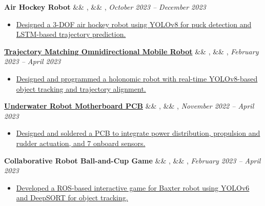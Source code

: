\documentclass[letterpaper,10pt]{article}
\newcommand{\experience}[5]{%
    \vspace{-1mm}%
    \noindent\textbf{#1}%
    \ifx&#2&
    \else
        , \textit{#2}%
    \fi
    \ifx&#3&
    \else
        , #3%
    \fi
    \hfill \textit{#4} \\
    \vspace{-6.8mm}%
    \begin{itemize}[itemsep=-5pt]
        \setlength{\itemindent}{0em}
        #5
    \end{itemize}
}
\begin{document}
\experience
    {Air Hockey Robot}
    {}
    {}
    {October 2023 – December 2023}
    {
        \item \href{https://ryanbarry.me/projects/robotics/air-hockey-robot/}{Designed a 3-DOF air hockey robot using YOLOv8 for puck detection and LSTM-based trajectory prediction.}
    }


    


    
\experience
    {\href{https://github.com/ryan-barry-99/Trajectory-Matching-Omnidirectional-Robot/blob/main/Real_time_Trajectory_Matching_of_Moving_Objects.pdf}{Trajectory Matching Omnidirectional Mobile Robot}}
    {}
    {}
    {February 2023 – April 2023}
    {

        \item \href{https://github.com/ryan-barry-99/Trajectory-Matching-Omnidirectional-Robot/tree/main/}{Designed and programmed a holonomic robot with real-time YOLOv8-based object tracking and trajectory alignment.}
    }
    
\experience
    {\href{https://ryanbarry.me/projects/electrical-engineering/underwater-robot/}{Underwater Robot Motherboard PCB}}
    {}
    {}
    {November 2022 – April 2023}
    {
        \item \href{https://ryanbarry.me/projects/electrical-engineering/underwater-robot/}{Designed and soldered a PCB to integrate power distribution, propulsion and rudder actuation, and 7 onboard sensors.}
        
    }
    
\experience
    {Collaborative Robot Ball-and-Cup Game}
    {}
    {}
    {February 2023 – April 2023}
    {
        \item \href{https://github.com/ryan-barry-99/DeepSORT-with-OAK-D-for-Collaborative-Robots/tree/main}{Developed a ROS-based interactive game for Baxter robot using YOLOv6 and DeepSORT for object tracking.}
    }
    
\end{document}
